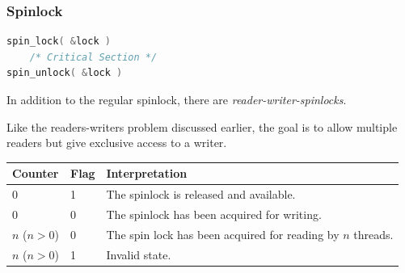 \begin{frame}[fragile]
\frametitle{Spinlock}

\begin{lstlisting}[language=C]
spin_lock( &lock )
    /* Critical Section */
spin_unlock( &lock )
\end{lstlisting}


In addition to the regular spinlock, there are \textit{reader-writer-spinlocks}.

Like the readers-writers problem discussed earlier, the goal is to allow multiple readers but give exclusive access to a writer. 

\begin{center}
\begin{tabular}{l|l|l}
	\textbf{Counter} & \textbf{Flag} & \textbf{Interpretation}\\\hline
	0 & 1 & The spinlock is released and available. \\
	0 & 0 & The spinlock has been acquired for writing.\\
	$n$ ($n > 0$) & 0 & The spin lock has been acquired for reading by $n$ threads.\\
	$n$ ($n > 0$) & 1 & Invalid state.\\
\end{tabular}
\end{center}


\end{frame}





